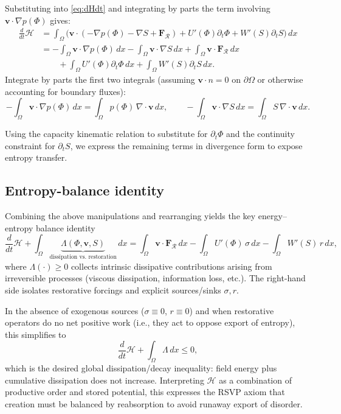 \documentclass[12pt]{article}
\begin{document}
Substituting into \eqref{eq:dHdt} and integrating by parts the term involving $\mathbf v\cdot\nabla p(\Phi)$ gives:
\begin{align}
\frac{d}{dt}\mathcal H
&= \int_{\Omega}\Big(\mathbf v\cdot(-\nabla p(\Phi)-\nabla S + \mathbf F_{\mathcal R}) + U'(\Phi)\partial_t\Phi + W'(S)\partial_t S\Big)\,dx \nonumber\\
&= -\int_{\Omega}\mathbf v\cdot\nabla p(\Phi)\,dx - \int_{\Omega}\mathbf v\cdot\nabla S\,dx + \int_{\Omega}\mathbf v\cdot\mathbf F_{\mathcal R}\,dx \nonumber\\
&\qquad + \int_{\Omega}U'(\Phi)\partial_t\Phi\,dx + \int_{\Omega}W'(S)\partial_t S\,dx. \label{eq:dHdt2}
\end{align}
Integrate by parts the first two integrals (assuming $\mathbf v\cdot n=0$ on $\partial\Omega$ or otherwise accounting for boundary fluxes):
\[
-\int_{\Omega}\mathbf v\cdot\nabla p(\Phi)\,dx
= \int_{\Omega} p(\Phi)\,\nabla\!\cdot\mathbf v\,dx,
\qquad
-\int_{\Omega}\mathbf v\cdot\nabla S\,dx = \int_{\Omega} S\,\nabla\!\cdot\mathbf v\,dx.
\]

Using the capacity kinematic relation to substitute for $\partial_t\Phi$ and the continuity constraint for $\partial_t S$, we express the remaining terms in divergence form to expose entropy transfer.

\subsection{Entropy-balance identity}
Combining the above manipulations and rearranging yields the key energy–entropy balance identity
\[
\frac{d}{dt}\mathcal H + \int_{\Omega}\! \underbrace{\Lambda(\Phi,\mathbf v,S)}_{\text{dissipation vs.\ restoration}}\,dx
= \int_{\Omega}\mathbf v\cdot\mathbf F_{\mathcal R}\,dx - \int_{\Omega}U'(\Phi)\,\sigma\,dx - \int_{\Omega}W'(S)\,r\,dx,
\]
where $\Lambda(\cdot)\ge 0$ collects intrinsic dissipative contributions arising from irreversible processes (viscous dissipation, information loss, etc.). The right-hand side isolates restorative forcings and explicit sources/sinks $\sigma,r$.

In the absence of exogenous sources ($\sigma\equiv 0$, $r\equiv 0$) and when restorative operators do no net positive work (i.e., they act to oppose export of entropy), this simplifies to
\[
\frac{d}{dt}\mathcal H + \int_{\Omega}\Lambda\,dx \le 0,
\]
which is the desired global dissipation/decay inequality: field energy plus cumulative dissipation does not increase. Interpreting $\mathcal H$ as a combination of productive order and stored potential, this expresses the RSVP axiom that creation must be balanced by reabsorption to avoid runaway export of disorder.
\end{document}
